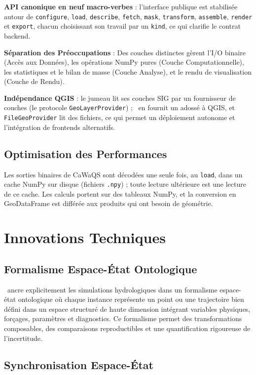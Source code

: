 \textbf{API canonique en neuf macro-verbes} : l'interface publique est stabilisée autour de \texttt{configure}, \texttt{load}, \texttt{describe}, \texttt{fetch}, \texttt{mask}, \texttt{transform}, \texttt{assemble}, \texttt{render} et \texttt{export}, chacun choisissant son travail par un \texttt{kind}, ce qui clarifie le contrat backend.

\textbf{Séparation des Préoccupations} : Des couches distinctes gèrent l'I/O binaire (Accès aux Données), les opérations NumPy pures (Couche Computationnelle), les statistiques et le bilan de masse (Couche Analyse), et le rendu de visualisation (Couche de Rendu).

\textbf{Indépendance QGIS} : le jumeau lit ses couches SIG par un fournisseur de couches (le protocole \texttt{GeoLayerProvider}) ; \cwv\ en fournit un adossé à QGIS, et \texttt{FileGeoProvider} lit des fichiers, ce qui permet un déploiement autonome et l'intégration de frontends alternatifs.

\subsection*{Optimisation des Performances}

Les sorties binaires de CaWaQS sont décodées une seule fois, au \texttt{load}, dans un cache NumPy sur disque (fichiers \texttt{.npy}) ; toute lecture ultérieure est une lecture de ce cache. Les calculs portent sur des tableaux NumPy, et la conversion en GeoDataFrame est différée aux produits qui ont besoin de géométrie.

\section*{Innovations Techniques}

\subsection*{Formalisme Espace-État Ontologique}

\hydrot\ ancre explicitement les simulations hydrologiques dans un formalisme espace-état ontologique où chaque instance représente un point ou une trajectoire bien défini dans un espace structuré de haute dimension intégrant variables physiques, forçages, paramètres et diagnostics. Ce formalisme permet des transformations composables, des comparaisons reproductibles et une quantification rigoureuse de l'incertitude.

\subsection*{Synchronisation Espace-État}

